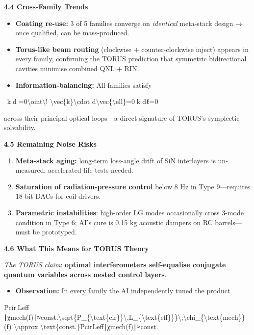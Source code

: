 \documentclass[]{article}
\begin{document}
\textbf{4.4 Cross-Family Trends}

\begin{itemize}
\item
  \textbf{Coating re-use:} 3 of 5 families converge on \emph{identical}
  meta-stack design → once qualified, can be mass-produced.
\item
  \textbf{Torus-like beam routing} (clockwise + counter-clockwise
  inject) appears in every family, confirming the TORUS prediction that
  symmetric bidirectional cavities minimise combined QNL + RIN.
\item
  \textbf{Information-balancing:} All families satisfy
\end{itemize}

∮ ⁣k⃗⋅dℓ⃗=0\textbackslash{}oint\textbackslash{}!
\textbackslash{}vec\{k\}\textbackslash{}cdot
d\textbackslash{}vec\{\textbackslash{}ell\}=0∮k⋅dℓ=0

across their principal optical loops---a direct signature of TORUS's
symplectic solvability.

\textbf{4.5 Remaining Noise Risks}

\begin{enumerate}
\def\labelenumi{\arabic{enumi}.}
\item
  \textbf{Meta-stack aging:} long-term loss-angle drift of SiN
  interlayers is un-measured; accelerated-life tests needed.
\item
  \textbf{Saturation of radiation-pressure control} below 8 Hz in Type
  9---requires 18 bit DACs for coil-drivers.
\item
  \textbf{Parametric instabilities}: high-order LG modes occasionally
  cross 3-mode condition in Type 6; AI's cure is 0.15 kg acoustic
  dampers on RC barrels---must be prototyped.
\end{enumerate}

\textbf{4.6 What This Means for TORUS Theory}

\emph{The TORUS claim}: \textbf{optimal interferometers self-equalise
conjugate quantum variables across nested control layers}.

\begin{itemize}
\item
  \textbf{Observation:} In every family the AI independently tuned the
  product
\end{itemize}

Pcir Leff  ∣χmech(f)∣≈const.\textbackslash{}sqrt\{P\_\{\textbackslash{}text\{cir\}\}\textbackslash{},L\_\{\textbackslash{}text\{eff\}\}\}\textbackslash{};\textbar{}\textbackslash{}chi\_\{\textbackslash{}text\{mech\}\}(f)\textbar{}
\textbackslash{}approx
\textbackslash{}text\{const.\}Pcir​Leff​​∣χmech​(f)∣≈const.
\end{document}
